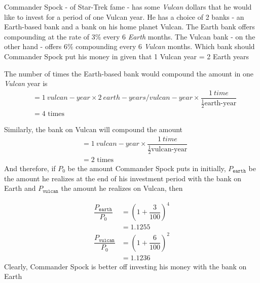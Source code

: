 

\question[4]   Commander Spock - of Star-Trek fame - has some \textit{Vulcan} dollars that he
would like to invest for a period of one Vulcan year. He has a choice of 2 banks - an Earth-based
bank and a bank on his home planet Vulcan. The Earth bank offers compounding at the
rate of 3\% every 6 \textit{Earth} months. The Vulcan bank - on the other hand - offers 6\% compounding
every 6 \textit{Vulcan} months. Which bank should Commander Spock put his money in given that
1 Vulcan year = 2 Earth years


\ifprintanswers
\fi 

\begin{solution}[\fullpage]
	The number of times the Earth-based bank would compound the amount in one \textit{Vulcan}
	year is 
	\begin{align}
		&= \SI{1}{vulcan-year}\times\SI{2}{earth-years\per vulcan-year}\times
		\dfrac{\SI{1}{time}}{\frac{1}{2}\text{earth-year}} \\
		&= 4\text{ times}
	\end{align}
	
	Similarly, the bank on Vulcan will compound the amount
	\begin{align}
		&= \SI{1}{vulcan-year}\times\dfrac{\SI{1}{time}}{\frac{1}{2}\text{vulcan-year}} \\
		&= 2\text{ times}
	\end{align}
	And therefore, if $P_0$ be the amount Commander Spock puts in initially, 
	$P_{\texttt{earth}}$ be the amount he realizes at the end of his investment period with the bank
	on Earth and $P_{\texttt{vulcan}}$ the amount he realizes on Vulcan, then 
	
	\begin{align}
		\dfrac{P_\texttt{earth}}{P_0} &= \left( 1 + \dfrac{3}{100}\right)^4 \\
		                       &= 1.1255 \\
		\dfrac{P_\texttt{vulcan}}{P_0} &= \left( 1 + \dfrac{6}{100}\right)^2 \\
		                        &= 1.1236
	\end{align}
	Clearly, Commander Spock is better off investing his
	money with the bank on Earth
\end{solution}
\ifprintanswers\begin{codex}\end{codex}\fi
